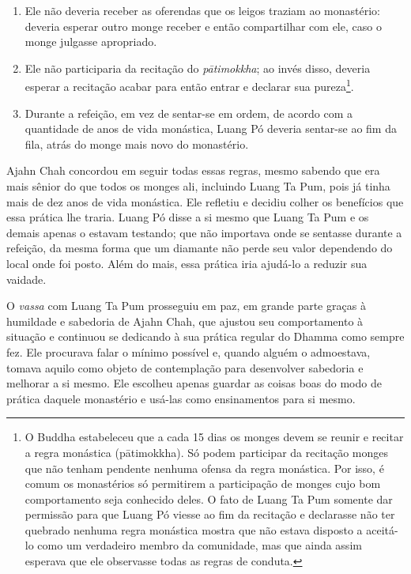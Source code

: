 \begin{enumerate}
\def\labelenumi{\arabic{enumi}.}
\item
  Ele não deveria receber as oferendas que os leigos traziam ao
  monastério: deveria esperar outro monge receber e então compartilhar
  com ele, caso o monge julgasse apropriado.
\item
  Ele não participaria da recitação do \emph{pātimokkha}; ao invés
  disso, deveria esperar a recitação acabar para então entrar e declarar
  sua pureza\footnote{O Buddha estabeleceu que a cada 15 dias os monges
    devem se reunir e recitar a regra monástica (pātimokkha). Só podem
    participar da recitação monges que não tenham pendente nenhuma
    ofensa da regra monástica. Por isso, é comum os monastérios só
    permitirem a participação de monges cujo bom comportamento seja
    conhecido deles. O fato de Luang Ta Pum somente dar permissão para
    que Luang Pó viesse ao fim da recitação e declarasse não ter
    quebrado nenhuma regra monástica mostra que não estava disposto a
    aceitá-lo como um verdadeiro membro da comunidade, mas que ainda
    assim esperava que ele observasse todas as regras de conduta.}.
\item
  Durante a refeição, em vez de sentar-se em ordem, de acordo com a
  quantidade de anos de vida monástica, Luang Pó deveria sentar-se ao
  fim da fila, atrás do monge mais novo do monastério.
\end{enumerate}

Ajahn Chah concordou em seguir todas essas regras, mesmo sabendo que era
mais sênior do que todos os monges ali, incluindo Luang Ta Pum, pois já
tinha mais de dez anos de vida monástica. Ele refletiu e decidiu colher
os benefícios que essa prática lhe traria. Luang Pó disse a si mesmo que
Luang Ta Pum e os demais apenas o estavam testando; que não importava
onde se sentasse durante a refeição, da mesma forma que um diamante não
perde seu valor dependendo do local onde foi posto. Além do mais, essa
prática iria ajudá-lo a reduzir sua vaidade.

O \emph{vassa} com Luang Ta Pum prosseguiu em paz, em grande parte
graças à humildade e sabedoria de Ajahn Chah, que ajustou seu
comportamento à situação e continuou se dedicando à sua prática regular
do Dhamma como sempre fez. Ele procurava falar o mínimo possível e,
quando alguém o admoestava, tomava aquilo como objeto de contemplação
para desenvolver sabedoria e melhorar a si mesmo. Ele escolheu apenas
guardar as coisas boas do modo de prática daquele monastério e usá-las
como ensinamentos para si mesmo.

